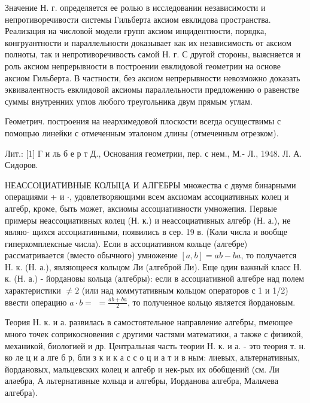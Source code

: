 \documentclass[10pt]{article}
\begin{document}
Значение Н. г. определяется ее ролью в исследовании независимости и непротиворечивости системы Гильберта аксиом евклидова пространства. Реализация на числовой модели групп аксиом инцидентности, порядка, конгруәнтности и параллельности доказывает как их независимость от аксиом полноты, так и непротиворечивость самой Н. г. С другой стороны, выясняется и роль аксиом непрерывности в построении евклидовой геометрии на основе аксиом Гильберта. В частности, без аксиом непрерывности невозможно доказать эквивалентность евклидовой аксиомы параллельности предложению о равенстве суммы внутренних углов любого треугольника двум прямым углам.



Геометрич. построения на неархимедовой плоскости всегда осуществимы с помощью линейки с отмеченным эталоном длины (отмеченным отрезком).



Лит.: [1] Г и ль б е р т Д., Основания геометрии, пер. с нем., М.- Л., 1948. Л. А. Сидоров.



НЕАССОЦИАТИВНЫЕ КОЛЫЦА И АЛГЕБРЫ множества с двумя бинарными операциями + и $\cdot$, удовлетворяющими всем аксиомам ассоциативных колец $и$ алгебр, кроме, быть может, аксиомы ассоциативности умножепия. Первые примеры неассоциативных колец (Н. к.) и неассоциативных алгебр (Н. а.), не являю- щихся ассоциативными, появились в сер. 19 в. (Кәли числа и вообще гиперкомплексные числа). Если в ассоциативном кольце (алгебре) рассматривается (вместо обычного) умножение $[a, b]=a b-b a$, то получается Н. к. (Н. а.), являющееся кольцом Ли (алгеброй Ли). Еще один важный класс Н. к. (Н. а.) - йордановы кольца (алгебры): если в ассоциативной алгебре над полем характеристики $\neq 2$ (или над коммутативным кольцом операторов с 1 и 1/2) ввести операцию $a \cdot b=$ $=\frac{a b+b a}{2}$, то полученное кольцо является йордановым.



Теория Н. к. и а. развилась в самостоятельное направление алгебры, пмеющее много точек соприкосновения с другими частями математики, а также с физикой, механикой, биологией и др. Центральная часть теории Н. к. и а. - это теория т. н. ко ле ц и а лге б р, бли з к и к а с с о ц и а т и в ным: лиевых, альтернативных, йордановых, мальцевских колец и алгебр и нек-рых их обобщений (см. Ли аләебра, А льтернативные кольца и алгебры, Иорданова алгебра, Мальчева алгебра).
\end{document}
